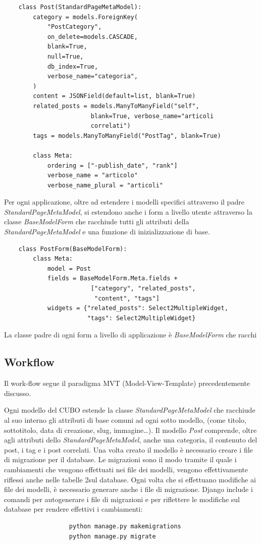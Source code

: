 \documentclass[12pt,a4paper]{article}
\begin{document}
\begin{verbatim}
    class Post(StandardPageMetaModel):
        category = models.ForeignKey(
            "PostCategory",
            on_delete=models.CASCADE,
            blank=True,
            null=True,
            db_index=True,
            verbose_name="categoria",
        )
        content = JSONField(default=list, blank=True)
        related_posts = models.ManyToManyField("self",
                        blank=True, verbose_name="articoli
                        correlati")
        tags = models.ManyToManyField("PostTag", blank=True)

        class Meta:
            ordering = ["-publish_date", "rank"]
            verbose_name = "articolo"
            verbose_name_plural = "articoli"
\end{verbatim}
Per ogni applicazione, oltre ad estendere i modelli specifici attraverso il padre \textit{StandardPageMetaModel}, si estendono anche i form a livello utente attraverso la classe \textit{BaseModelForm} che racchiude tutti gli attributi della \textit{StandardPageMetaModel} e una funzione di inizializzazione di base.

\begin{verbatim}
    class PostForm(BaseModelForm):
        class Meta:
            model = Post
            fields = BaseModelForm.Meta.fields +
                        ["category", "related_posts",
                         "content", "tags"]
            widgets = {"related_posts": Select2MultipleWidget,
                       "tags": Select2MultipleWidget}
\end{verbatim}

La classe padre di ogni form a livello di applicazione è \textit{BaseModelForm} che racchi
\subsection{Workflow}
Il work-flow segue il paradigma MVT (Model-View-Template) precedentemente discusso.

Ogni modello del CUBO estende la classe \textit{StandardPageMetaModel} che racchiude al suo interno gli attributi di base comuni ad ogni sotto modello, (come titolo, sottotitolo, data di creazione, slug, immagine…).
Il modello \textit{Post} comprende, oltre agli attributi dello \textit{StandardPageMetaModel}, anche una categoria, il contenuto del post, i tag e i post correlati.
Una volta creato il modello è necessario creare i file di migrazione per il database.
Le migrazioni sono il modo tramite il quale i cambiamenti che vengono effettuati nei file dei modelli, vengono effettivamente riflessi anche nelle tabelle 2sul database.
Ogni volta che si effettuano modifiche ai file dei modelli, è necessario generare anche i file di migrazione. Django include i comandi per autogenerare i file di migrazioni e per riflettere le modifiche sul database per rendere effettivi i  cambiamenti:
\begin{verbatim}
                  python manage.py makemigrations
                  python manage.py migrate
\end{verbatim}
\end{document}
